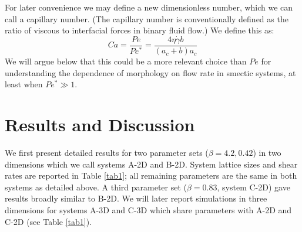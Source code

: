 \documentclass[8.5pt,twoside,twocolumn]{article}
\begin{document}
For later convenience we may define a new dimensionless number,
which we can call a capillary number. (The capillary number is conventionally defined as the ratio of viscous to interfacial forces in binary fluid flow.) We define this as:
%
\begin{equation}
Ca = \frac{Pe}{Pe^*} = \frac{4\eta\dot\gamma b}{(a_c+b)a_c}
\label{capillary}
\end{equation}
%
We will argue below that this could be a more relevant choice than $Pe$ for understanding the dependence of morphology on flow rate in smectic systems, at least when $Pe^*\gg 1$.

\section{Results and Discussion}

We first present detailed results for two parameter sets ($\beta = 4.2, 0.42$) in two dimensions which we call systems A-2D and B-2D. System lattice sizes and shear rates are reported in Table \ref{tab1}; all remaining parameters are the same in both systems as detailed above. 
A third parameter set ($\beta = 0.83$, system C-2D) gave results broadly similar to B-2D. We will later report simulations in three dimensions for systems A-3D and C-3D which share parameters with A-2D and C-2D (see Table \ref{tab1}).
\end{document}
